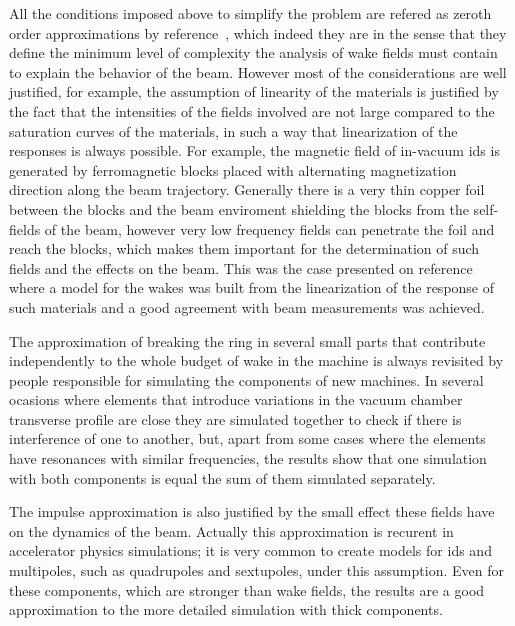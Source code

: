     All the conditions imposed above to simplify the problem are refered as zeroth order approximations by reference~\cite{Stupakov2000a}, which indeed they are in the sense that they define the minimum level of complexity the analysis of wake fields must contain to explain the behavior of the beam. However most of the considerations are well justified, for example, the assumption of linearity of the materials is justified by the fact that the intensities of the fields involved are not large compared to the saturation curves of the materials, in such a way that linearization of the responses is always possible. For example, the magnetic field of in-vacuum \gls{ids} is generated by ferromagnetic blocks placed with alternating magnetization direction along the beam trajectory. Generally there is a very thin copper foil between the blocks and the beam enviroment shielding the blocks from the self-fields of the beam, however very low frequency fields can penetrate the foil and reach the blocks, which makes them important for the determination of such fields and the effects on the beam. This was the case presented on reference~\cite{Bassi} where a model for the wakes was built from the linearization of the response of such materials and a good agreement with beam measurements was achieved.

    The approximation of breaking the ring in several small parts that contribute independently to the whole budget of wake in the machine is always revisited by people responsible for simulating the components of new machines. In several ocasions where elements that introduce variations in the vacuum chamber transverse profile are close they are simulated together to check if there is interference of one to another, but, apart from some cases where the elements have resonances with similar frequencies, the results show that one simulation with both components is equal the sum of them simulated separately.

    The impulse approximation is also justified by the small effect these fields have on the dynamics of the beam. Actually this approximation is recurent in accelerator physics simulations; it is very common to create models for \gls{ids} and multipoles, such as quadrupoles and sextupoles, under this assumption. Even for these components, which are stronger than wake fields, the results are a good approximation to the more detailed simulation with thick components.

